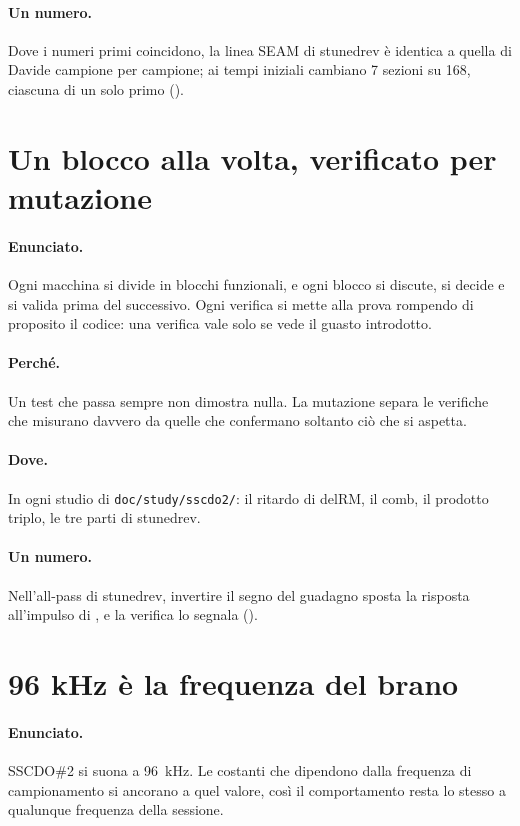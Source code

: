 \paragraph{Un numero.}
Dove i numeri primi coincidono, la linea SEAM di stunedrev è identica a quella di Davide campione per campione; ai tempi iniziali cambiano 7 sezioni su 168, ciascuna di un solo primo ().

\section{Un blocco alla volta, verificato per mutazione}\label{sec:principio-blocchi}
\paragraph{Enunciato.}
Ogni macchina si divide in blocchi funzionali, e ogni blocco si discute, si decide e si valida prima del successivo.
Ogni verifica si mette alla prova rompendo di proposito il codice: una verifica vale solo se vede il guasto introdotto.

\paragraph{Perché.}
Un test che passa sempre non dimostra nulla.
La mutazione separa le verifiche che misurano davvero da quelle che confermano soltanto ciò che si aspetta.

\paragraph{Dove.}
In ogni studio di \texttt{doc/study/sscdo2/}: il ritardo di delRM, il comb, il prodotto triplo, le tre parti di stunedrev.

\paragraph{Un numero.}
Nell'all-pass di stunedrev, invertire il segno del guadagno sposta la risposta all'impulso di , e la verifica lo segnala ().

\section{96 kHz è la frequenza del brano}\label{sec:principio-96k}
\paragraph{Enunciato.}
SSCDO\#2 si suona a \qty{96}{\kilo\hertz}.
Le costanti che dipendono dalla frequenza di campionamento si ancorano a quel valore, così il comportamento resta lo stesso a qualunque frequenza della sessione.

